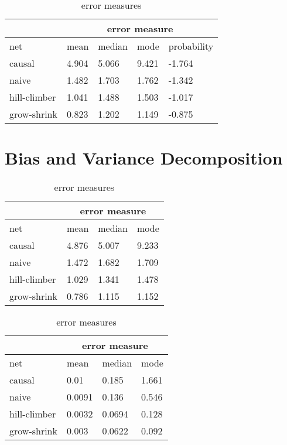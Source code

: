 \begin{table}[h]
\centering
\begin{tabular}{ l l l l l  }
 \hline
  & \multicolumn{4}{c}{error measure} \\
 \hline
 net & mean & median & mode & probability\\
 \hline
 causal   & 4.904    & 5.066  & 9.421   &-1.764\\
 naive   & 1.482      & 1.703 & 1.762  &-1.342\\
 hill-climber   & 1.041      & 1.488 & 1.503  &-1.017\\
 grow-shrink   & 0.823     & 1.202  & 1.149 &-0.875\\
 
\end{tabular}
\caption[Crossvalidation Error]{error measures}
\label{tab:3}
\end{table}

\section{Bias and Variance Decomposition}

\begin{table}[h]
\centering
\begin{tabular}{ l l l l }
 \hline
 & \multicolumn{3}{c}{error measure} \\
 \hline
 net & mean & median & mode\\
 \hline
 causal & 4.876 & 5.007 & 9.233\\
 naive & 1.472 & 1.682 & 1.709\\
 hill-climber & 1.029 & 1.341 & 1.478\\
 grow-shrink & 0.786 & 1.115 & 1.152\\
\end{tabular}
\caption[Bias]{error measures}
\label{tab:4}
\end{table}

\begin{table}[h]
\centering
\begin{tabular}{ l l l l }
 \hline
  & \multicolumn{3}{c}{error measure} \\
 \hline
 net & mean & median & mode\\
 \hline
 causal & 0.01& 0.185 & 1.661\\
 naive & 0.0091 & 0.136 & 0.546\\
 hill-climber & 0.0032 & 0.0694 & 0.128\\
 grow-shrink & 0.003 & 0.0622& 0.092\\
\end{tabular}
\caption[Variance]{error measures}
\label{tab:5}
\end{table}